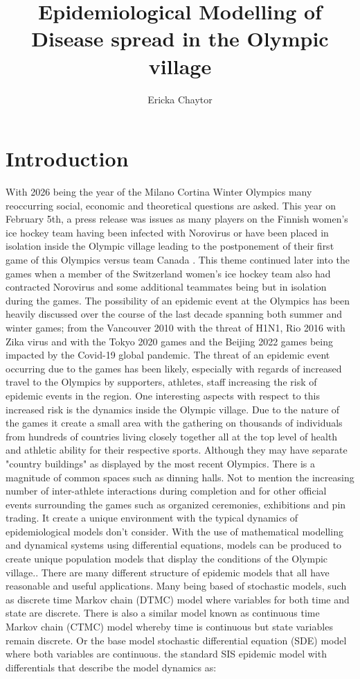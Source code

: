 \documentclass[12pt, oneside]{article}
\title{Epidemiological Modelling of Disease spread in the Olympic village}
\author{Ericka Chaytor}
\date{}
\begin{document}
\maketitle

\section*{Introduction}

With 2026 being the year of the Milano Cortina Winter Olympics many reoccurring social, economic and theoretical questions are asked. This year on February 5th, a press release was issues as many players on the Finnish women's ice hockey team having been infected with Norovirus or have been placed in isolation inside the Olympic village leading to the postponement of their first game of this Olympics versus team Canada \cite{salvian_2026_finlandcanada}. This theme continued later into the games when a member of the Switzerland women's ice hockey team also had contracted Norovirus and some additional teammates being but in isolation during the games. The possibility of an epidemic event at the Olympics has been heavily discussed over the course of the last decade spanning both summer and winter games; from the Vancouver 2010 with the threat of H1N1, Rio 2016 with Zika virus and with the Tokyo 2020 games and the Beijing 2022 games being impacted by the Covid-19 global pandemic. The threat of an epidemic event occurring due to the games has been likely, especially with regards of  increased travel to the Olympics by supporters, athletes, staff increasing the risk of epidemic events in the region. One interesting aspects with respect to this increased risk is the dynamics inside the Olympic village. Due to the nature of the games it create a small area with the gathering on thousands of individuals from hundreds of countries living closely together all at the top level of health and athletic ability for their respective sports. Although they may have separate "country buildings" as displayed by the most recent Olympics. There is a magnitude of common spaces such as dinning halls. Not to mention the increasing number of inter-athlete interactions during completion and for other official events surrounding the games such as organized ceremonies, exhibitions and pin trading. It create a unique environment with the typical dynamics of epidemiological models don't consider. With the use of mathematical modelling and dynamical systems using differential equations, models can be produced to create unique population models that display the conditions of the Olympic village.. There are many different structure of epidemic models that all have reasonable and useful applications. Many being based of stochastic models, such as discrete time Markov chain (DTMC) model where variables for both time and state are discrete. There is also a similar model known as continuous time Markov chain (CTMC) model whereby time is continuous but state variables remain discrete. Or the base model stochastic differential equation (SDE) model where both variables are continuous. \cite{allen2008introduction} the standard SIS epidemic model with differentials that describe the model dynamics as:
\end{document}
